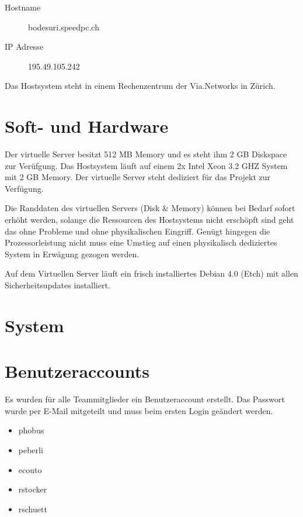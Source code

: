 \documentclass[a4paper,12pt,halfparskip,DIV14]{scrreprt}
\begin{document}
\begin{description}
  \item[Hostname] bodesuri.speedpc.ch
  \item[IP Adresse] 195.49.105.242
\end{description}

Das Hostsystem steht in einem Rechenzentrum der Via.Networks in Zürich.


\section{Soft- und Hardware} %
\label{sec:soft_und_hardware}

Der virtuelle Server besitzt 512 MB Memory und es steht ihm 2 GB Diskspace zur Verüfgung. Das Hostsystem läuft auf einem 2x Intel Xeon 3.2 GHZ System mit 2 GB Memory. Der virtuelle Server steht dediziert für das Projekt zur Verfügung.

Die Randdaten des virtuellen Servers (Disk \& Memory) können bei Bedarf sofort erhöht werden, solange die Ressourcen des Hostsystems nicht erschöpft sind geht das ohne Probleme und ohne physikalischen Eingriff. Genügt hingegen die Prozessorleistung nicht muss eine Umstieg auf einen physikalisch dediziertes System in Erwägung gezogen werden.

Auf dem Virtuellen Server läuft ein frisch installiertes Debian 4.0 (Etch) mit allen Sicherheitsupdates installiert.


\section{System} %
\label{sec:system}


\section{Benutzeraccounts} %
\label{sec:benutzeraccounts}

Es wurden für alle Teammitglieder ein Benutzeraccount erstellt. Das Passwort wurde per E-Mail mitgeteilt und muss beim ersten Login geändert werden.

\begin{itemize}
  \item phobus
  \item peberli
  \item ecouto
  \item rstocker
  \item rschuett
\end{itemize}
\end{document}
